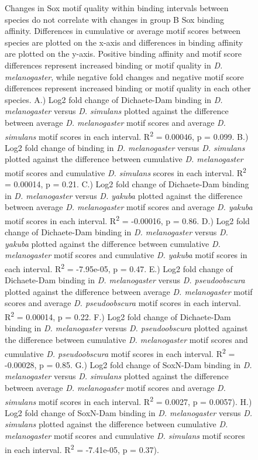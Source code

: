 \begin{figure}[H]
\centering
\caption[Changes in Sox motif quality within binding intervals between species do not correlate with changes in group B Sox binding affinity]{Changes in Sox motif quality within binding intervals between species do not correlate with changes in group B Sox binding affinity. Differences in cumulative or average motif scores between species are plotted on the x-axis and differences in binding affinity are plotted on the y-axis. Positive binding affinity and motif score differences represent increased binding or motif quality in \emph{D. melanogaster}, while negative fold changes and negative motif score differences represent increased binding or motif quality in each other species. A.) Log2 fold change of Dichaete-Dam binding in \emph{D. melanogaster} versus \emph{D. simulans} plotted against the difference between average \emph{D. melanogaster} motif scores and average \emph{D. simulans} motif scores in each interval. R\textsuperscript{2} = 0.00046, p = 0.099. B.) Log2 fold change of binding in \emph{D. melanogaster} versus \emph{D. simulans} plotted against the difference between cumulative \emph{D. melanogaster} motif scores and cumulative \emph{D. simulans} scores in each interval. R\textsuperscript{2} = 0.00014, p = 0.21. C.) Log2 fold change of Dichaete-Dam binding in \emph{D. melanogaster} versus \emph{D. yakuba} plotted against the difference between average \emph{D. melanogaster} motif scores and average \emph{D. yakuba} motif scores in each interval. R\textsuperscript{2} = -0.00016, p = 0.86. D.) Log2 fold change of Dichaete-Dam binding in \emph{D. melanogaster} versus \emph{D. yakuba} plotted against the difference between cumulative \emph{D. melanogaster} motif scores and cumulative \emph{D. yakuba} motif scores in each interval. R\textsuperscript{2} = -7.95e-05, p = 0.47. E.) Log2 fold change of Dichaete-Dam binding in \emph{D. melanogaster} versus \emph{D. pseudoobscura}  plotted against the difference between average \emph{D. melanogaster} motif scores and average \emph{D. pseudoobscura} motif scores in each interval. R\textsuperscript{2} =  0.00014, p = 0.22.  F.) Log2 fold change of Dichaete-Dam binding in \emph{D. melanogaster} versus \emph{D. pseudoobscura}  plotted against the difference between cumulative \emph{D. melanogaster} motif scores and cumulative \emph{D. pseudoobscura} motif scores in each interval. R\textsuperscript{2} =  -0.00028, p = 0.85. G.) Log2 fold change of SoxN-Dam binding in \emph{D. melanogaster} versus \emph{D. simulans} plotted against the difference between average \emph{D. melanogaster} motif scores and average \emph{D. simulans} motif scores in each interval. R\textsuperscript{2} = 0.0027, p = 0.0057). H.) Log2 fold change of SoxN-Dam binding in \emph{D. melanogaster} versus \emph{D. simulans} plotted against the difference between cumulative \emph{D. melanogaster} motif scores and cumulative \emph{D. simulans} motif scores in each interval. R\textsuperscript{2} =  -7.41e-05, p = 0.37).}
\label{Figure 5.28}
\end{figure}
 
